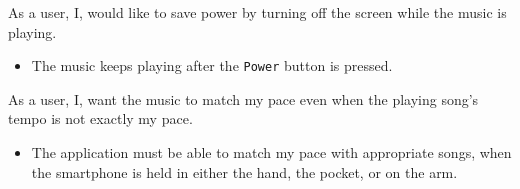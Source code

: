 {As a user, I, would like to save power by turning off the screen while the music is playing.}
{\begin{itemize}
\item The music keeps playing after the \texttt{Power} button is pressed.
\end{itemize}}

{As a user, I, want the music to match my pace even when the playing song's tempo is not exactly my pace.}
{\begin{itemize}
\item The application must be able to match my pace with appropriate songs, when the smartphone is held in either the hand, the pocket, or on the arm.
\end{itemize}}



